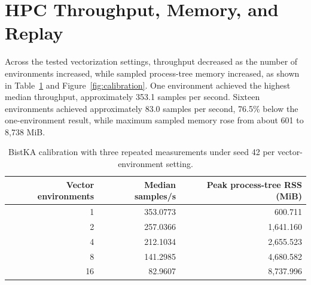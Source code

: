 \documentclass[12pt,a4paper,oneside]{book}
\theoremstyle{plain}
\numberwithin{equation}{chapter} \DeclareMathOperator{\Var}{Var}
\begin{document}
\section{HPC Throughput, Memory, and Replay}

Across the tested vectorization settings, throughput decreased as the number of environments increased, while sampled process-tree memory increased, as shown in Table~\ref{tab:calibration} and Figure~\ref{fig:calibration}. One environment achieved the highest median throughput, approximately 353.1 samples per second. Sixteen environments achieved approximately 83.0 samples per second, 76.5\% below the one-environment result, while maximum sampled memory rose from about 601 to 8,738 MiB.

\begin{table}[H]
\centering
\small
\caption{BistKA calibration with three repeated measurements under seed 42 per vector-environment setting.}
\label{tab:calibration}
\begin{tabular}{@{}rrr@{}}
\toprule
Vector environments & Median samples/s & Peak process-tree RSS (MiB) \\
\midrule
1 & 353.0773 & 600.711 \\
2 & 257.0366 & 1,641.160 \\
4 & 212.1034 & 2,655.523 \\
8 & 141.2985 & 4,680.582 \\
16 & 82.9607 & 8,737.996 \\
\bottomrule
\end{tabular}
\end{table}
\end{document}
